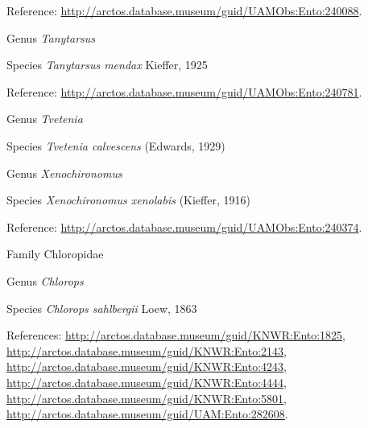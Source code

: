\documentclass[9pt, article]{memoir}
\begin{document}
\begin{multicols}{2}
\vspace{6pt}Reference: 
\url{http://arctos.database.museum/guid/UAMObs:Ento:240088}.

\vspace{6pt}\noindent\hspace{30pt}Genus \textit{Tanytarsus}


\vspace{6pt}\noindent\hspace{36pt}Species \textit{Tanytarsus mendax} Kieffer, 1925


\vspace{6pt}Reference: 
\url{http://arctos.database.museum/guid/UAMObs:Ento:240781}.

\vspace{6pt}\noindent\hspace{30pt}Genus \textit{Tvetenia}


\vspace{6pt}\noindent\hspace{36pt}Species \textit{Tvetenia calvescens} (Edwards, 1929)


\vspace{6pt}\noindent\hspace{30pt}Genus \textit{Xenochironomus}


\vspace{6pt}\noindent\hspace{36pt}Species \textit{Xenochironomus xenolabis} (Kieffer, 1916)


\vspace{6pt}Reference: 
\url{http://arctos.database.museum/guid/UAMObs:Ento:240374}.

\vspace{6pt}\noindent\hspace{24pt}Family Chloropidae


\vspace{6pt}\noindent\hspace{30pt}Genus \textit{Chlorops}


\vspace{6pt}\noindent\hspace{36pt}Species \textit{Chlorops sahlbergii} Loew, 1863


\vspace{6pt}References: 
\url{http://arctos.database.museum/guid/KNWR:Ento:1825}, 
\url{http://arctos.database.museum/guid/KNWR:Ento:2143}, 
\url{http://arctos.database.museum/guid/KNWR:Ento:4243}, 
\url{http://arctos.database.museum/guid/KNWR:Ento:4444}, 
\url{http://arctos.database.museum/guid/KNWR:Ento:5801}, 
\url{http://arctos.database.museum/guid/UAM:Ento:282608}.


\end{multicols}
\end{document}
